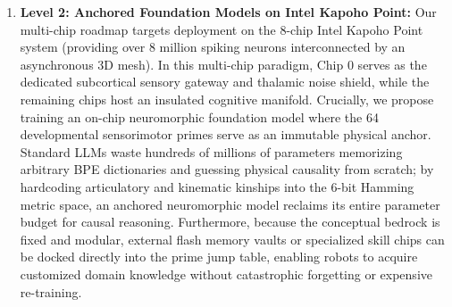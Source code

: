 \documentclass[journal,twocolumn]{IEEEtran}
\begin{document}
\begin{enumerate}
    \item \textbf{Level 2: Anchored Foundation Models on Intel Kapoho Point:} Our multi-chip roadmap targets deployment on the 8-chip Intel Kapoho Point system (providing over 8 million spiking neurons interconnected by an asynchronous 3D mesh). In this multi-chip paradigm, Chip 0 serves as the dedicated subcortical sensory gateway and thalamic noise shield, while the remaining chips host an insulated cognitive manifold. Crucially, we propose training an on-chip neuromorphic foundation model where the 64 developmental sensorimotor primes serve as an immutable physical anchor. Standard LLMs waste hundreds of millions of parameters memorizing arbitrary BPE dictionaries and guessing physical causality from scratch; by hardcoding articulatory and kinematic kinships into the 6-bit Hamming metric space, an anchored neuromorphic model reclaims its entire parameter budget for causal reasoning. Furthermore, because the conceptual bedrock is fixed and modular, external flash memory vaults or specialized skill chips can be docked directly into the prime jump table, enabling robots to acquire customized domain knowledge without catastrophic forgetting or expensive re-training.
\end{enumerate}
\end{document}
